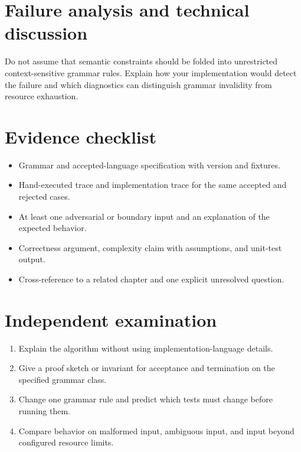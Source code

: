 \documentclass[11pt,letterpaper]{article}
\begin{document}
\section{Failure analysis and technical discussion}
Do not assume that semantic constraints should be folded into unrestricted context-sensitive grammar rules. Explain how your implementation would detect the failure and which diagnostics can distinguish grammar invalidity from resource exhaustion.
\section{Evidence checklist}
\begin{itemize}
\item Grammar and accepted-language specification with version and fixtures.
\item Hand-executed trace and implementation trace for the same accepted and rejected cases.
\item At least one adversarial or boundary input and an explanation of the expected behavior.
\item Correctness argument, complexity claim with assumptions, and unit-test output.
\item Cross-reference to a related chapter and one explicit unresolved question.
\end{itemize}
\section{Independent examination}
\begin{enumerate}
\item Explain the algorithm without using implementation-language details.
\item Give a proof sketch or invariant for acceptance and termination on the specified grammar class.
\item Change one grammar rule and predict which tests must change before running them.
\item Compare behavior on malformed input, ambiguous input, and input beyond configured resource limits.
\end{enumerate}
\end{document}
